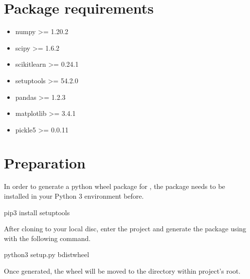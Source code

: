 \documentclass[letterpaper,10pt,english]{sphinxmanual}
\begin{document}
\section{Package requirements}
\label{\detokenize{install:package-requirements}}\begin{itemize}
\item {} 
\sphinxAtStartPar
numpy \textgreater{}= 1.20.2

\item {} 
\sphinxAtStartPar
scipy \textgreater{}= 1.6.2

\item {} 
\sphinxAtStartPar
scikit\sphinxhyphen{}learn \textgreater{}= 0.24.1

\item {} 
\sphinxAtStartPar
setuptools \textgreater{}= 54.2.0

\item {} 
\sphinxAtStartPar
pandas \textgreater{}= 1.2.3

\item {} 
\sphinxAtStartPar
matplotlib \textgreater{}= 3.4.1

\item {} 
\sphinxAtStartPar
pickle5 \textgreater{}= 0.0.11

\end{itemize}


\section{Preparation}
\label{\detokenize{install:preparation}}
\sphinxAtStartPar
In order to generate a python wheel package for , the package  needs to be installed in your Python
3 environment before.

\begin{sphinxVerbatim}[commandchars=\\\{\}]
pip3 install setuptools
\end{sphinxVerbatim}

\sphinxAtStartPar
After cloning  to your local disc, enter the project and generate the package using with the following command.

\begin{sphinxVerbatim}[commandchars=\\\{\}]
python3 setup.py bdist\PYGZus{}wheel
\end{sphinxVerbatim}

\sphinxAtStartPar
Once generated, the wheel will be moved to the  directory within project’s root.
\end{document}

